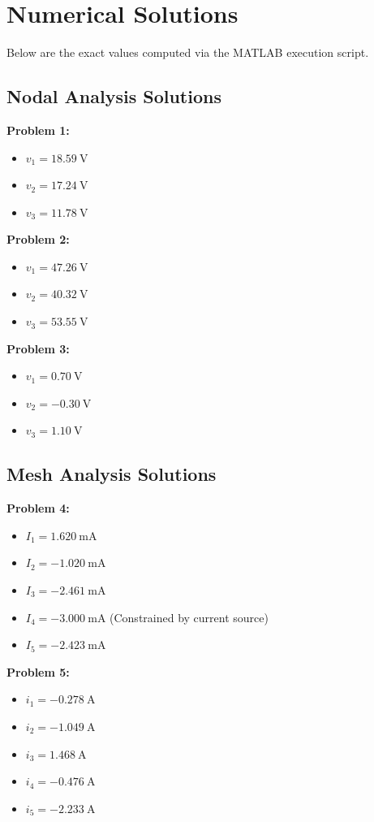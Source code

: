 \documentclass[11pt]{article}
\begin{document}
\section*{Numerical Solutions}
Below are the exact values computed via the MATLAB execution script.

\subsection*{Nodal Analysis Solutions}

\textbf{Problem 1:}
\begin{itemize}
  \item $v_1 = \SI{18.59}{\volt}$
  \item $v_2 = \SI{17.24}{\volt}$
  \item $v_3 = \SI{11.78}{\volt}$
\end{itemize}

\textbf{Problem 2:}
\begin{itemize}
  \item $v_1 = \SI{47.26}{\volt}$
  \item $v_2 = \SI{40.32}{\volt}$
  \item $v_3 = \SI{53.55}{\volt}$
\end{itemize}

\textbf{Problem 3:}
\begin{itemize}
  \item $v_1 = \SI{0.70}{\volt}$
  \item $v_2 = \SI{-0.30}{\volt}$
  \item $v_3 = \SI{1.10}{\volt}$
\end{itemize}

\subsection*{Mesh Analysis Solutions}

\textbf{Problem 4:}
\begin{itemize}
  \item $I_1 = \SI{1.620}{\milli\ampere}$
  \item $I_2 = \SI{-1.020}{\milli\ampere}$
  \item $I_3 = \SI{-2.461}{\milli\ampere}$
  \item $I_4 = \SI{-3.000}{\milli\ampere}$ (Constrained by current source)
  \item $I_5 = \SI{-2.423}{\milli\ampere}$
\end{itemize}

\textbf{Problem 5:}
\begin{itemize}
  \item $i_1 = \SI{-0.278}{\ampere}$
  \item $i_2 = \SI{-1.049}{\ampere}$
  \item $i_3 = \SI{1.468}{\ampere}$
  \item $i_4 = \SI{-0.476}{\ampere}$
  \item $i_5 = \SI{-2.233}{\ampere}$
\end{itemize}
\end{document}
